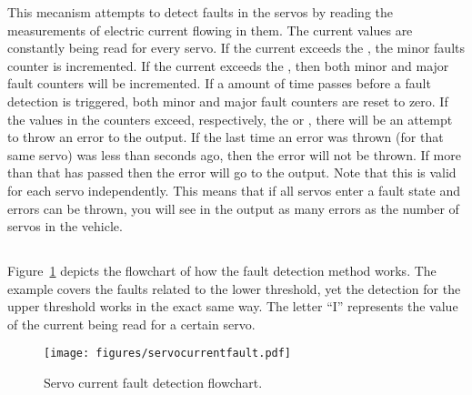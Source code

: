 This mecanism attempts to detect faults in the servos by reading the measurements of electric current flowing in them.
The current values are constantly being read for every servo. If the current exceeds the \scfdCLT, the minor faults counter is incremented. If the current exceeds the \scfdCUT, then both minor and major fault counters will be incremented. If a \scfdFTC amount of time passes before a fault detection is triggered, both minor and major fault counters are reset to zero.
If the values in the counters exceed, respectively, the \scfdMLF or \scfdMUF, there will be an attempt to throw an error to the output.
If the last time an error was thrown (for that same servo) was less than \scfdETP seconds ago, then the error will not be thrown. If more than that has passed then the error will go to the output. Note that this is valid for each servo independently. This means that if all servos enter a fault state and errors can be thrown, you will see in the output as many errors as the number of servos in the vehicle.

\subsection{\secnameFlowchart}

Figure~\ref{fig:servocurrfault} depicts the flowchart of how the fault detection method works. The example covers the faults related to the lower threshold, yet the detection for the upper threshold works in the exact same way. The letter ``I'' represents the value of the current being read for a certain servo.

\begin{figure}[htbp]
\begin{center}
\texttt{[image: figures/servocurrentfault.pdf]}
\end{center}
\caption{Servo current fault detection flowchart.}\label{fig:servocurrfault}
\end{figure}
